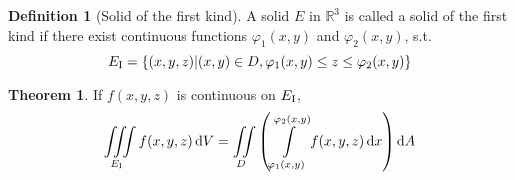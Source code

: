 \documentclass[fleqn, a4paper, 12pt]{article}
\theoremstyle{definition}
\newtheorem{definition}{Definition}
\theoremstyle{theorem}
\newtheorem{theorem}{Theorem}
\theoremstyle{remark}
\begin{document}
\begin{definition}[Solid of the first kind]
	A solid $E$ in $\mathbb{R}^3$ is called a solid of the first kind if there exist continuous functions $\varphi_1(x,y)$ and $\varphi_2(x,y)$, s.t.
	\begin{equation*}
		E_{\textnormal{I}} = \{(x,y,z) | (x,y) \in D, \varphi_1(x,y) \leq z \leq \varphi_2(x,y)\}
	\end{equation*}
\end{definition}

\begin{theorem}
	If $f(x,y,z)$ is continuous on $E_{\textnormal{I}}$,
	\begin{equation*}
		\iiint\limits_{E_{\textnormal{I}}} f(x,y,z) \dif V = \iint\limits_{D} \left( \int\limits_{\varphi_1(x,y)}^{\varphi_2(x,y)} f(x,y,z) \dif x \right) \dif A
	\end{equation*}
\end{theorem}
\end{document}
